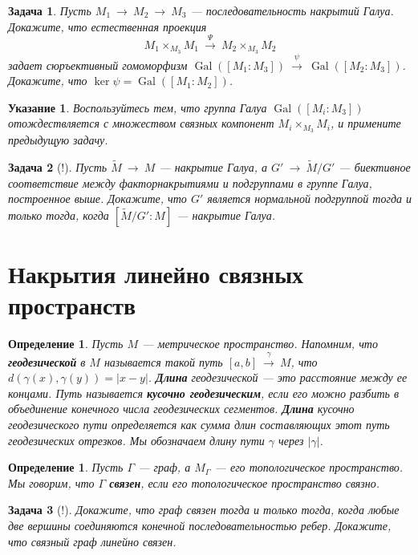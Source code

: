\documentclass[12pt]{book}
\newcommand{\subs}{\section}
\newcommand{\arrow}{{\:\longrightarrow\:}}
\newcommand{\Gal}{\operatorname{Gal}}
\theoremstyle{upshape}
\newtheorem{zadacha}{Задача}[chapter]
\theoremstyle{generic}
\newtheorem{opredelenie}[teorema]{Определение}
\theoremstyle{upshapenonumber}
\newtheorem{ukazanie}{Указание}[section]
\newcommand{\следствие}{%
     \refstepcounter{teorema}
     {\noindent\bf Следствие \thechapter.\arabic{teorema}:\ }}
\newcommand{\пример}{%
     \refstepcounter{teorema}
     {\noindent\bf Пример \thechapter.\arabic{teorema}:\ }}
\newcommand{\лемма}{%
     \refstepcounter{teorema}
     {\noindent\bf Лемма \thechapter.\arabic{teorema}:\ }}
\newcommand{\теорема}{%
     \refstepcounter{teorema}
     {\noindent\bf Теорема \thechapter.\arabic{teorema}:\ }}
\newcommand{\утверждение}{%
     \refstepcounter{teorema}
     {\noindent\bf Утверждение \thechapter.\arabic{teorema}:\ }}
\begin{document}
{\begin{zadacha} 
Пусть $M_1\arrow M_2 \arrow M_3$ --- последовательность
накрытий Галуа. Докажите, что естественная проекция
\[ M_1 \times_{M_3} M_1 \stackrel\Psi\arrow  M_2 \times_{M_3} M_2
\]
задает сюръективный гомоморфизм 
$\Gal([M_1:M_3])\stackrel\psi\arrow \Gal([M_2:M_3])$. 
Докажите, что $\ker\psi=\Gal([M_1:M_2])$.
\end{zadacha}

\begin{ukazanie}
Воспользуйтесь тем, что 
группа Галуа $\Gal([M_i:M_3])$ отождествляется
с множеством связных компонент
$M_i\times_{M_3}M_i$, и примените 
предыдущую задачу.  
\end{ukazanie}

\begin{zadacha}[!]
Пусть $\tilde M \arrow M$ --- накрытие Галуа,
а $G' \arrow \tilde M/G'$ --- биективное соответствие
между факторнакрытиями и подгруппами 
в группе Галуа, построенное выше.
Докажите, что $G'$ является нормальной подгруппой
тогда и только тогда, когда $[\tilde M/G':M]$ --- накрытие Галуа.
\end{zadacha}


\subs{Накрытия линейно связных пространств}

\begin{opredelenie}
Пусть $M$ --- метрическое пространство. Напомним, что
{\bf геодезической} в $M$ называется такой путь
$[a,b] \stackrel\gamma\arrow M$, что $d(\gamma(x), \gamma(y))=|x-y|$.
{\bf Длина} геодезической --- это расстояние между ее концами.
Путь называется {\bf кусочно геодезическим}, если
его можно разбить в объединение конечного числа 
геодезических сегментов. {\bf Длина} кусочно
геодезического пути определяется как сумма длин
составляющих этот путь геодезических отрезков.
Мы обозначаем длину пути $\gamma$ через $|\gamma|$.
\end{opredelenie}

\begin{opredelenie}
Пусть $\Gamma$ --- граф, а $M_\Gamma$ --- его топологическое
пространство. Мы говорим, что $\Gamma$ {\bf связен},
если его топологическое пространство связно. 
\end{opredelenie}

\begin{zadacha}[!]
Докажите, что граф связен
тогда и только тогда, когда любые две вершины
соединяются конечной последовательностью ребер.
Докажите, что связный граф линейно связен.
\end{zadacha}

}
\end{document}
